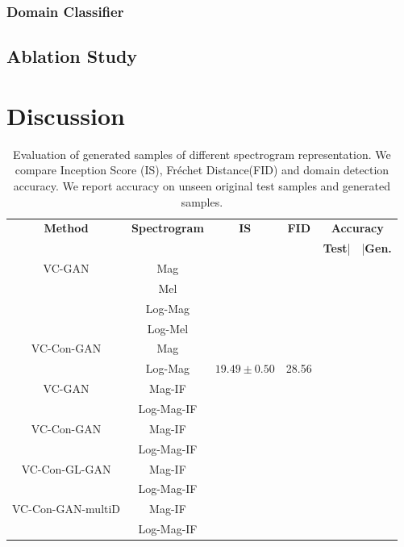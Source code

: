 \subsubsection{Domain Classifier}
\label{subsub:dclf}
\subsection{Ablation Study}

\section{Discussion}
\label{sec:discussion}



\begin{table}
    \centering
    \begin{tabular}{cccccc}
    \toprule
    \textbf{Method}     & \textbf{Spectrogram} & \textbf{IS} & \textbf{FID} & \multicolumn{2}{c}{\textbf{Accuracy}}\\
    \cmidrule(r){5-6}
    & & & & \textbf{Test}|&|\textbf{Gen.}\\
    \midrule
     VC-GAN    & Mag & & & \\
         & Mel & & &\\
         & Log-Mag && & \\
         & Log-Mel & & &\\
    \midrule
     VC-Con-GAN    & Mag & & & \\
         & Log-Mag & $19.49\pm0.50$ & 28.56 & \\
    \midrule
     VC-GAN    & Mag-IF & & & \\
         & Log-Mag-IF& & &\\ 
    \midrule
     VC-Con-GAN    & Mag-IF & & & \\
         & Log-Mag-IF& & &\\ 
    \midrule
     VC-Con-GL-GAN    & Mag-IF& & & \\
         & Log-Mag-IF& & & \\
    \midrule
     VC-Con-GAN-multiD    & Mag-IF & & & \\
         & Log-Mag-IF& & &\\               
    \bottomrule 
    \end{tabular}
    \caption{Evaluation of generated samples of different spectrogram representation. We compare Inception Score (IS), Fr\'{e}chet Distance(FID) and domain detection accuracy. We report accuracy on unseen original test samples and generated samples.}
    \label{tab:eval_gan}
\end{table}


